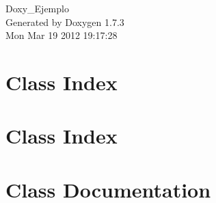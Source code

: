 \documentclass[a4paper]{book}
\begin{document}
\hypersetup{pageanchor=false}
\begin{titlepage}
\vspace*{7cm}
\begin{center}
{\Large Doxy\_\-Ejemplo }\\
\vspace*{1cm}
{\large Generated by Doxygen 1.7.3}\\
\vspace*{0.5cm}
{\small Mon Mar 19 2012 19:17:28}\\
\end{center}
\end{titlepage}
\clearemptydoublepage
{}
\tableofcontents
\clearemptydoublepage
{}
\hypersetup{pageanchor=true}
\chapter{Class Index}

\chapter{Class Index}

\chapter{Class Documentation}















\printindex
\end{document}
